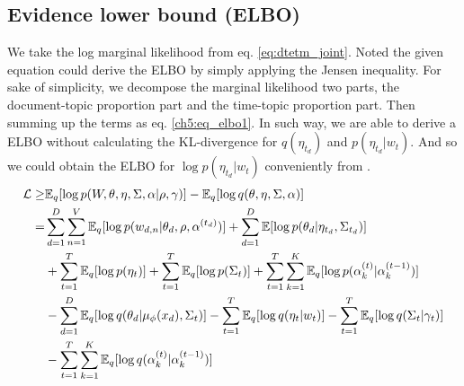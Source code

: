 \subsection{Evidence lower bound (ELBO)}
We take the log marginal likelihood from eq. \ref{eq:dtetm_joint}. Noted the given equation could derive the ELBO by simply applying the Jensen inequality. For sake of simplicity, we decompose the marginal likelihood two parts, the document-topic proportion part and the time-topic proportion part. Then summing up the terms as eq. \ref{ch5:eq_elbo1}. In such way, we are able to derive a ELBO without calculating the KL-divergence for $ q(\eta_{t_d}) $ and $ p(\eta_{t_d}|w_t) $. And so we could obtain the ELBO for $ \log p(\eta_{t_d}|w_t) $ conveniently from \cite{titsias_bayesian_nodate}.
\begin{align}\label{ch5:eq_elbo1}
\mathcal{L}\geq&\mathbb{E}_q[\log p(W,\theta,\eta,\Sigma,\alpha|\rho,\gamma)]-\mathbb{E}_q[\log q(\theta,\eta,\Sigma,\alpha)]\notag\\
=&\sum_{d=1}^{D}\sum_{n=1}^{V}\mathbb{E}_q[\log p(w_{d,n}|\theta_d,\rho,\alpha^{(t_d)})]+\sum_{d=1}^{D}\mathbb{E}[\log p(\theta_d|\eta_{t_d},\Sigma_{t_d})]\notag\\
&+\sum_{t=1}^{T}\mathbb{E}_{q}[\log p(\eta_{t})]+\sum_{t=1}^{T}\mathbb{E}_q[\log p(\Sigma_{t})]+\sum_{t=1}^{T}\sum_{k=1}^{K}\mathbb{E}_{q}[\log p(\alpha_{k}^{(t)}|\alpha_{k}^{(t-1)})]\notag\\
&-\sum_{d=1}^{D}\mathbb{E}_q[\log q(\theta_d|\mu_{\phi}(x_d),\Sigma_{t})]-\sum_{t=1}^{T}\mathbb{E}_{q}[\log q(\eta_{t}|w_{t})]-\sum_{t=1}^{T}\mathbb{E}_q[\log q(\Sigma_{t}|\gamma_{t})]\notag\\
&-\sum_{t=1}^{T}\sum_{k=1}^{K}\mathbb{E}_q[\log q(\alpha_{k}^{(t)}|\alpha_{k}^{(t-1)})]
\end{align}
